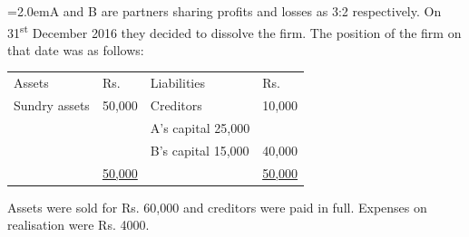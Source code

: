 \documentclass[11pt,a4paper]{article}
\newcommand{\lqn}[2]{\Needspace{6\baselineskip}\par\medskip\noindent\hangindent=2.0em\hangafter=1\makebox[2.0em][l]{\textbf{#1.}}#2\par}
\begin{document}
\lqn{106}{A and B are partners sharing profits and losses as 3:2 respectively. On 31\textsuperscript{st} December 2016 they decided to dissolve the firm. The position of the firm on that date was as follows:\par
\par\smallskip\noindent\hspace*{1.2em}\begin{tabular}{|llll|}
\hline
Assets & Rs. & Liabilities & Rs. \\
Sundry assets & 50,000 & Creditors & 10,000 \\
 &  & A’s capital   25,000 &  \\
 &  & B’s capital   15,000 & 40,000 \\
 & \underline{50,000} &  & \underline{50,000} \\
\hline
\end{tabular}\par\smallskip
Assets were sold for Rs. 60,000 and creditors were paid in full. Expenses on realisation were Rs. 4000.\par
}
\end{document}
